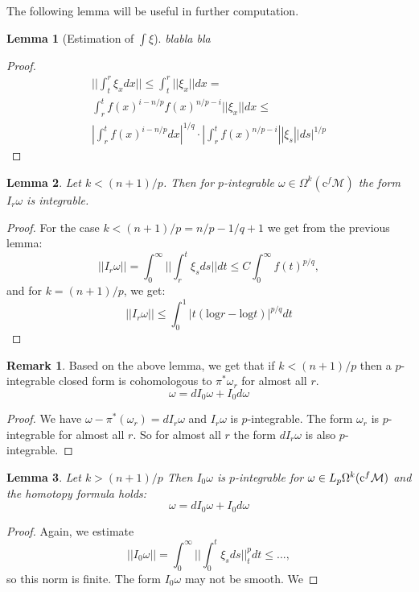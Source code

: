 \documentclass[licencjacka]{pracamgr}
\theoremstyle{definition}
\theoremstyle{definition}
\newtheorem{remark}{Remark}[section]
\theoremstyle{plain}
\newtheorem{lemma}{Lemma}[section]
\theoremstyle{plain}
\def\cfm{\ensuremath\mathrm{c}^f\mathcal{M}}
\begin{document}
The following lemma will be useful in further computation.
\begin{lemma}[Estimation of $\int \xi$]
  blabla bla
\end{lemma}
\begin{proof}
\begin{multline*}
    || \int_t^r \xi_x dx || \leq
     \int_t^r || \xi_x || dx  =  \\
     \int_r^t f(x)^{i - n/p} f(x)^{n/p - i} || \xi_x || dx  \leq  \\
   | \int_r^t f(x)^{i - n/p} dx|^{1/q} \cdot
   |\int_r^t f(x)^{n/p - i} || \xi_s || ds |^{1/p}
\end{multline*}
\end{proof}


\begin{lemma}
   Let $k < (n+1)/p$. Then for $p$-integrable $\omega \in
   \Omega^k(\mathrm{c}^f\mathcal{M})$ the form $I_r\omega$ is
   integrable.
\end{lemma}
\begin{proof}
  For the case $k < (n+1)/p = n/p - 1/q + 1$ we get from the previous lemma:
\[
||I_r\omega|| = \int_0^\infty ||\int_r^t \xi_s ds|| dt \leq
 C \int_0^\infty f(t)^{p/q},
\]
and for $k=(n+1)/p$, we get:
\[
  ||I_r\omega|| \leq \int_0^1 | t(\mathrm{log} r - \mathrm{log} t)  |^{p/q} dt
\]
\end{proof}

\begin{remark} %
  Based on the above lemma, we get that if $k<(n+1)/p$ then a $p$-integrable
closed form is cohomologous to $\pi^\ast \omega_r$ for almost all $r$.
\[
    \omega = dI_0\omega + I_0d\omega
\]
\end{remark}
\begin{proof}
  We have $\omega - \pi^\ast(\omega_r) = dI_r\omega$ and $I_r \omega$ is 
$p$-integrable. The form $\omega_r$ is $p$-integrable for almost all $r$.
So for almost all $r$ the form $dI_r\omega$ is also $p$-integrable.
\end{proof}

\begin{lemma} %
  Let $k > (n+1)/p$ Then $I_0 \omega $ is $p$-integrable for 
$\omega \in L_p \Omega^k(\cfm)$ and the homotopy formula holds:
\[
    \omega = d I_0 \omega + I_0 d \omega
\]
\end{lemma}
\begin{proof}
  Again, we estimate 
\[
    ||I_0 \omega|| = \int_0^\infty ||\int_0^t \xi_s ds||_t^p dt \leq
    ...,
\]
so this norm is finite. The form $I_0 \omega$ may not be smooth. We
\end{proof}
\end{document}
